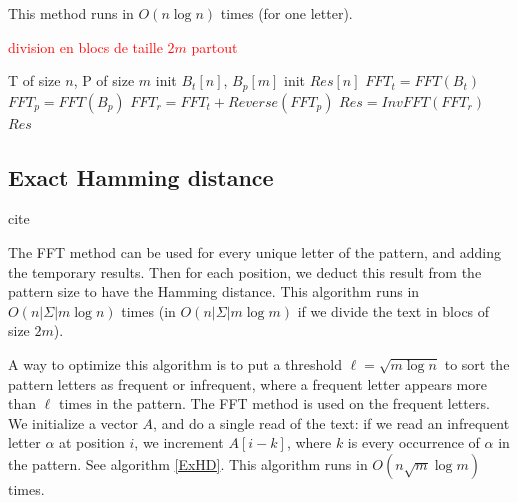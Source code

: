 \documentclass[preprint,12pt]{elsarticle}
\begin{document}
This method runs in $O(n \log n)$ times (for one letter).

\textcolor{red}{division en blocs de taille $2m$ partout}

\begin{algorithm}
\caption{$HD\_FFT(T, P, \alpha)$: }
\label{MethodFFT}
\begin{algorithmic}[1]
\REQUIRE T of size $n$, P of size $m$
\STATE init $B_t[n]$, $B_p[m]$ 
\STATE init $Res[n]$
\ENDFOR
{} 
	  
\ENDFOR
\STATE $FFT_t = FFT(B_t)$ 
\STATE $FFT_p = FFT(B_p)$
\STATE $FFT_r = FFT_t + Reverse(FFT_p)$
\STATE $Res = InvFFT(FFT_r)$ 
\RETURN $Res$

\end{algorithmic}
\end{algorithm}



\subsection{Exact Hamming distance}
\label{eHD}

cite \cite{ExactHD}

The FFT method can be used for every unique letter of the pattern, and adding the temporary results.
Then for each position, we deduct this result from the pattern size to have the Hamming distance.
This algorithm runs in $O(n|\Sigma| m \log n)$ times
(in $O(n|\Sigma| m \log m)$ if we divide the text in blocs of size $2m$).

A way to optimize this algorithm is to put a threshold $\ell = \sqrt{m \log n}$
to sort the pattern letters as frequent or infrequent,
where a frequent letter appears more than $\ell$ times in the pattern.
The FFT method is used on the frequent letters.
We initialize a vector $A$, and do a single read of the text:
if we read an infrequent letter $\alpha$ at position $i$, we increment $A[i-k]$,
where $k$ is every occurrence of $\alpha$ in the pattern.
See algorithm \ref{ExHD}.
This algorithm runs in $O(n \sqrt{m} \log m)$ times.
\end{document}

